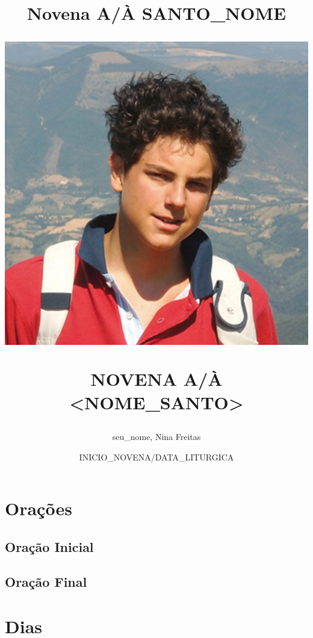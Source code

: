 \documentclass[11pt]{article}
\title{Novena A/À SANTO_NOME}
\title{
  \includegraphics[scale=0.5]{./assets/imagem.jpg} \par
  NOVENA A/À <NOME_SANTO>
}
\author{seu_nome, Nina Freitas}
\date{INICIO_NOVENA/DATA_LITURGICA}
\begin{document}
\maketitle

\pagestyle{fancy}
  
\tableofcontents

\centering

\section{Orações}\label{oracoes}


\subsection{Oração Inicial}

\subsection{Oração Final}




\section{Dias}
\label{sec:orgb503227}
\end{document}
